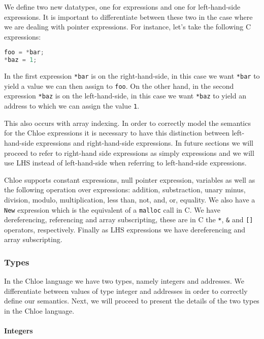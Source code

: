 We define two new datatypes, one for expressions and one for left-hand-side expressions.
It is important to differentiate between these two in the case where we are dealing with pointer expressions.
For instance, let's take the following C expressions:

\begin{lstlisting}[language=C, frame=single]
foo = *bar;
*baz = 1;
\end{lstlisting}

In the first expression \verb|*bar| is on the right-hand-side, in this case we want \verb|*bar| to yield a value we can then assign to \verb|foo|.
On the other hand, in the second expression \verb|*baz| is on the left-hand-side, in this case we want \verb|*baz| to yield an address to which we can assign the value \verb|1|.

This also occurs with array indexing.
In order to correctly model the semantics for the Chloe expressions it is necessary to have this distinction between left-hand-side expressions and right-hand-side expressions.
In future sections we will proceed to refer to right-hand side expressions as simply expressions and we will use LHS instead of left-hand-side when referring to left-hand-side expressions.

Chloe supports constant expressions, null pointer expression, variables as well as the following operation over expressions: addition, substraction, unary minus, division, modulo, multiplication, less than, not, and, or, equality.
We also have a \verb|New| expression which is the equivalent of a \verb|malloc| call in C.
We have dereferencing, referencing and array subscripting, these are in C the \verb|*|, \verb|&| and \verb|[]| operators, respectively.
Finally as LHS expressions we have dereferencing and array subscripting.

\subsubsection{Types}

In the Chloe language we have two types, namely integers and addresses.
We differentiate between values of type integer and addresses in order to correctly define our semantics.
Next, we will proceed to present the details of the two types in the Chloe language.

\paragraph{Integers}

